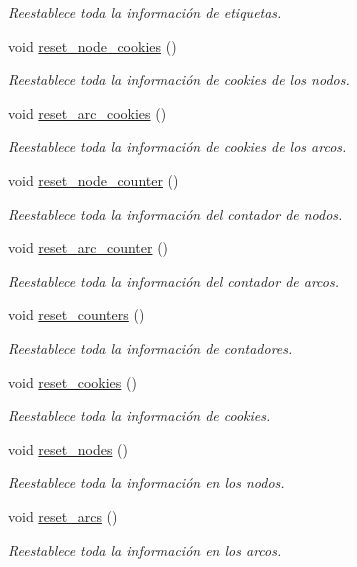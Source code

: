 \begin{DoxyCompactItemize}
\begin{DoxyCompactList}\small\item\em Reestablece toda la información de etiquetas. \end{DoxyCompactList}\item 
void \hyperlink{class_designar_1_1_base_graph_ab797f80e7efa5a6d0b33f925d6079c18}{reset\+\_\+node\+\_\+cookies} ()
\begin{DoxyCompactList}\small\item\em Reestablece toda la información de cookies de los nodos. \end{DoxyCompactList}\item 
void \hyperlink{class_designar_1_1_base_graph_a44b6cefb8966ed69a0d80bfe7e4546cb}{reset\+\_\+arc\+\_\+cookies} ()
\begin{DoxyCompactList}\small\item\em Reestablece toda la información de cookies de los arcos. \end{DoxyCompactList}\item 
void \hyperlink{class_designar_1_1_base_graph_a53603f64b51b470cc6b8c8d6d2b643a4}{reset\+\_\+node\+\_\+counter} ()
\begin{DoxyCompactList}\small\item\em Reestablece toda la información del contador de nodos. \end{DoxyCompactList}\item 
void \hyperlink{class_designar_1_1_base_graph_a8b22e29aa37006fab9c219de86660bdd}{reset\+\_\+arc\+\_\+counter} ()
\begin{DoxyCompactList}\small\item\em Reestablece toda la información del contador de arcos. \end{DoxyCompactList}\item 
void \hyperlink{class_designar_1_1_base_graph_a881c342d8f25d43f995ccfdf876622e1}{reset\+\_\+counters} ()
\begin{DoxyCompactList}\small\item\em Reestablece toda la información de contadores. \end{DoxyCompactList}\item 
void \hyperlink{class_designar_1_1_base_graph_a96a630fd589c34e7e6242f4349606e1c}{reset\+\_\+cookies} ()
\begin{DoxyCompactList}\small\item\em Reestablece toda la información de cookies. \end{DoxyCompactList}\item 
void \hyperlink{class_designar_1_1_base_graph_a1b21c48fed41f36ad4158d718f837c89}{reset\+\_\+nodes} ()
\begin{DoxyCompactList}\small\item\em Reestablece toda la información en los nodos. \end{DoxyCompactList}\item 
void \hyperlink{class_designar_1_1_base_graph_a6dc66191c2d752bf7f67a4522a7830e3}{reset\+\_\+arcs} ()
\begin{DoxyCompactList}\small\item\em Reestablece toda la información en los arcos. \end{DoxyCompactList}\end{DoxyCompactItemize}
